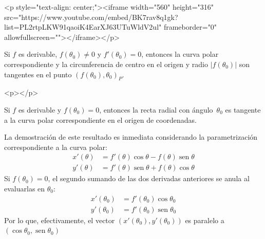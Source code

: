 \begin{rawhtml}
<p style="text-align: center;"><iframe width="560" height="316" src="https://www.youtube.com/embed/BK7rav8q1gk?list=PL2rtpLKW91qaoiK4EarXJ63UTuWldV2ul" frameborder="0" allowfullscreen=""></iframe></p>
\end{rawhtml}

\begin{proposicion}
Si $f$ es derivable, $f(\theta_0)\ne 0$ y $f'(\theta_0)=0$, entonces la curva polar correspondiente y la circunferencia de centro en el origen y radio $|f(\theta_0)|$ son tangentes en el punto $(f(\theta_0),\theta_0)_P$.
\end{proposicion}
\begin{rawhtml}
<p></p>
\end{rawhtml}
\begin{proposicion}
Si $f$ es derivable y $f(\theta_0)=0$,
entonces la recta radial con ángulo~$\theta_0$ es
tangente a la curva polar correspondiente en el origen de coordenadas.
\end{proposicion}

La demostración de este resultado es inmediata considerando la parametrización correspondiente a la curva polar:
\begin{align*}
x'(\theta)&=f'(\theta)\cos\theta-f(\theta)\operatorname{sen}\theta\\
y'(\theta)&=f'(\theta)\operatorname{sen}\theta+f(\theta)\cos\theta
\end{align*}
Si $f(\theta_0)=0$, el segundo sumando de las dos derivadas anteriores se anula al evaluarlas en $\theta_0$:
\begin{align*}
x'(\theta_0)&=f'(\theta_0)\cos\theta_0 \\
y'(\theta_0)&=f'(\theta_0)\operatorname{sen}\theta_0
\end{align*}
Por lo que, efectivamente, el vector
$(x'(\theta_0),y'(\theta_0))$ es  paralelo a $(\cos\theta_0,\operatorname{sen}\theta_0)$



